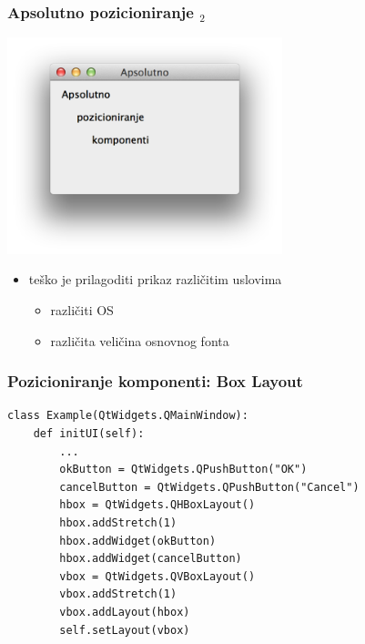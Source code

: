 \documentclass[utf8,compress,aspectratio=169]{beamer}
\begin{document}
\begin{frame}
  \frametitle{Apsolutno pozicioniranje $_2$}
\begin{center}
\includegraphics[width=8cm]{pyqt05.png}
\end{center}
  \begin{itemize}
    \item teško je prilagoditi prikaz različitim uslovima
    \begin{itemize}
      \item različiti OS
      \item različita veličina osnovnog fonta
    \end{itemize}
  \end{itemize}
\end{frame}

\begin{frame}[fragile]
  \frametitle{Pozicioniranje komponenti: Box Layout}
\begin{verbatim}
class Example(QtWidgets.QMainWindow):
    def initUI(self):
        ...
        okButton = QtWidgets.QPushButton("OK")
        cancelButton = QtWidgets.QPushButton("Cancel")
        hbox = QtWidgets.QHBoxLayout()
        hbox.addStretch(1)
        hbox.addWidget(okButton)
        hbox.addWidget(cancelButton)
        vbox = QtWidgets.QVBoxLayout()
        vbox.addStretch(1)
        vbox.addLayout(hbox)
        self.setLayout(vbox)
\end{verbatim}
\end{frame}
\end{document}
